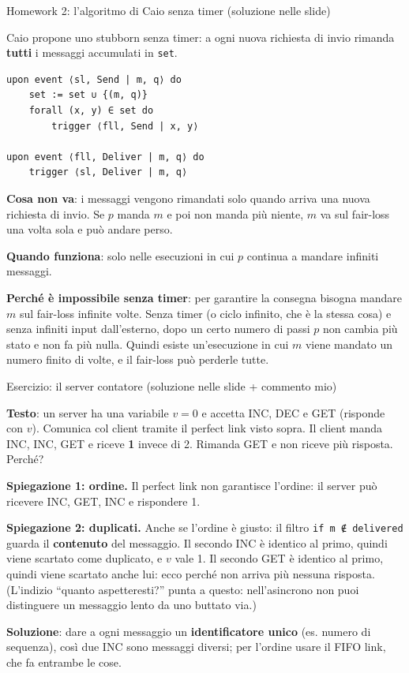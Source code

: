 \begin{approfondimento}{Homework 2: l'algoritmo di Caio senza timer (soluzione nelle slide)}

Caio propone uno stubborn senza timer: a ogni nuova richiesta di invio rimanda \textbf{tutti} i messaggi accumulati in \texttt{set}.

\begin{verbatim}
upon event ⟨sl, Send | m, q⟩ do
    set := set ∪ {(m, q)}
    forall (x, y) ∈ set do
        trigger ⟨fll, Send | x, y⟩

upon event ⟨fll, Deliver | m, q⟩ do
    trigger ⟨sl, Deliver | m, q⟩
\end{verbatim}

\textbf{Cosa non va}: i messaggi vengono rimandati solo quando arriva una nuova richiesta di invio. Se \(p\) manda \(m\) e poi non manda più niente, \(m\) va sul fair-loss una volta sola e può andare perso.

\textbf{Quando funziona}: solo nelle esecuzioni in cui \(p\) continua a mandare infiniti messaggi.

\textbf{Perché è impossibile senza timer}: per garantire la consegna bisogna mandare \(m\) sul fair-loss infinite volte. Senza timer (o ciclo infinito, che è la stessa cosa) e senza infiniti input dall'esterno, dopo un certo numero di passi \(p\) non cambia più stato e non fa più nulla. Quindi esiste un'esecuzione in cui \(m\) viene mandato un numero finito di volte, e il fair-loss può perderle tutte.

\end{approfondimento}

\begin{approfondimento}{Esercizio: il server contatore (soluzione nelle slide + commento mio)}

\textbf{Testo}: un server ha una variabile \(v = 0\) e accetta INC, DEC e GET (risponde con \(v\)). Comunica col client tramite il perfect link visto sopra. Il client manda INC, INC, GET e riceve \textbf{1} invece di 2. Rimanda GET e non riceve più risposta. Perché?

\textbf{Spiegazione 1: ordine.} Il perfect link non garantisce l'ordine: il server può ricevere INC, GET, INC e rispondere 1.

\textbf{Spiegazione 2: duplicati.} Anche se l'ordine è giusto: il filtro \texttt{if\ m\ ∉\ delivered} guarda il \textbf{contenuto} del messaggio. Il secondo INC è identico al primo, quindi viene scartato come duplicato, e \(v\) vale 1. Il secondo GET è identico al primo, quindi viene scartato anche lui: ecco perché non arriva più nessuna risposta. (L'indizio ``quanto aspetteresti?'' punta a questo: nell'asincrono non puoi distinguere un messaggio lento da uno buttato via.)

\textbf{Soluzione}: dare a ogni messaggio un \textbf{identificatore unico} (es. numero di sequenza), così due INC sono messaggi diversi; per l'ordine usare il FIFO link, che fa entrambe le cose.

\end{approfondimento}

